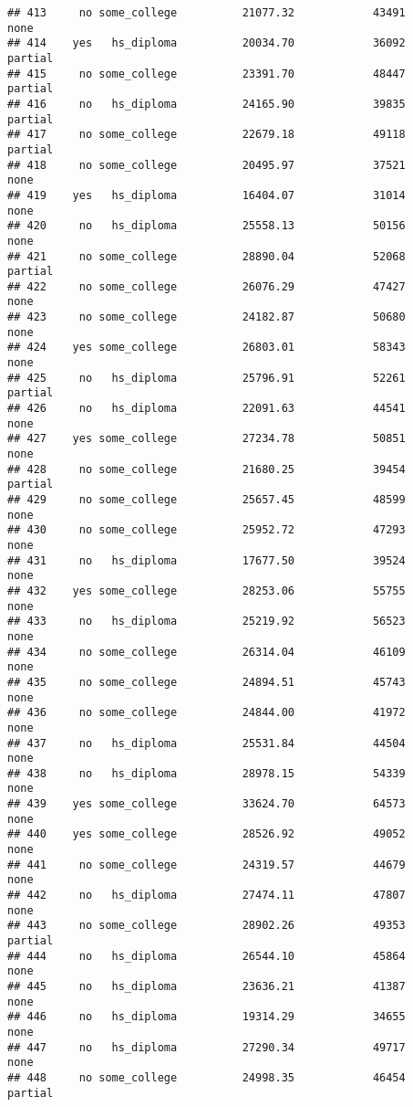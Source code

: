 \documentclass[
]{article}
\begin{document}
\begin{verbatim}
## 413     no some_college          21077.32            43491        none
## 414    yes   hs_diploma          20034.70            36092     partial
## 415     no some_college          23391.70            48447     partial
## 416     no   hs_diploma          24165.90            39835     partial
## 417     no some_college          22679.18            49118     partial
## 418     no some_college          20495.97            37521        none
## 419    yes   hs_diploma          16404.07            31014        none
## 420     no   hs_diploma          25558.13            50156        none
## 421     no some_college          28890.04            52068     partial
## 422     no some_college          26076.29            47427        none
## 423     no some_college          24182.87            50680        none
## 424    yes some_college          26803.01            58343        none
## 425     no   hs_diploma          25796.91            52261     partial
## 426     no   hs_diploma          22091.63            44541        none
## 427    yes some_college          27234.78            50851        none
## 428     no some_college          21680.25            39454     partial
## 429     no some_college          25657.45            48599        none
## 430     no some_college          25952.72            47293        none
## 431     no   hs_diploma          17677.50            39524        none
## 432    yes some_college          28253.06            55755        none
## 433     no   hs_diploma          25219.92            56523        none
## 434     no some_college          26314.04            46109        none
## 435     no some_college          24894.51            45743        none
## 436     no some_college          24844.00            41972        none
## 437     no   hs_diploma          25531.84            44504        none
## 438     no   hs_diploma          28978.15            54339        none
## 439    yes some_college          33624.70            64573        none
## 440    yes some_college          28526.92            49052        none
## 441     no some_college          24319.57            44679        none
## 442     no   hs_diploma          27474.11            47807        none
## 443     no some_college          28902.26            49353     partial
## 444     no   hs_diploma          26544.10            45864        none
## 445     no   hs_diploma          23636.21            41387        none
## 446     no   hs_diploma          19314.29            34655        none
## 447     no   hs_diploma          27290.34            49717        none
## 448     no some_college          24998.35            46454     partial

\end{verbatim}
\end{document}
